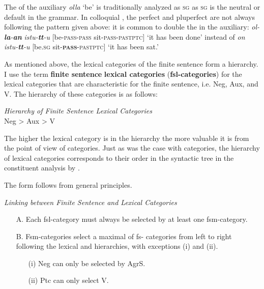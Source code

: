 \documentclass[output=paper]{langsci/langscibook}
\begin{document}
The  of the auxiliary \textit{olla} ‘be’ is traditionally analyzed as \textsc{sg} as \textsc{sg} is the neutral or default  in the  grammar. In colloquial , the perfect and pluperfect  are not always following the pattern given above: it is common to double the   in the auxiliary: \textit{ol-}\textbf{\textit{la}}\textit{{}-}\textbf{\textit{an}} \textit{istu-}\textbf{\textit{tt}}\textit{{}-u} [be-\textsc{pass}-\textsc{pass} sit-\textsc{pass}-\textsc{past}\textsc{ptc}] `it has been done’ instead of \textit{on istu-}\textbf{\textit{tt}}\textit{{}-u} [be.\textsc{sg} sit-\textbf{\textsc{pass}}{}-\textsc{past}\textsc{ptc}] ‘it has been sat.’

As mentioned above, the lexical categories of the finite sentence form a hierarchy. I use the term \textbf{finite sentence} \textbf{lexical categories} (\textbf{fsl-categories}) for the lexical categories that are characteristic for the finite sentence, i.e. Neg, Aux, and V. The hierarchy of these categories is as follows: 

\ea
\textit{{Hierarchy of Finite Sentence Lexical Categories}}\\
Neg > Aux > V
\z

The higher the lexical category is in the hierarchy the more valuable it is from the point of view of  categories. Just as was the case with  categories, the hierarchy of lexical categories corresponds to their order in the syntactic tree in the constituent analysis by \citet{HolmbergEtAl1993}. 

The  form follows from general principles. 

\ea
\textit{{Linking between Finite Sentence  and Lexical Categories}}
\begin{enumerate}
 \item[A.] Each fsl-category must always be selected by at least one fsm-category.
 \item[B.] Fsm-categories select a maximal  of fs- categories from left to right following the lexical and  hierarchies, with exceptions (i) and (ii).
\begin{enumerate}
 \item[(i)]  Neg can only be selected by AgrS.
 \item[(ii)] Ptc can only select V.
\end{enumerate}
\end{enumerate}
\z
\end{document}
